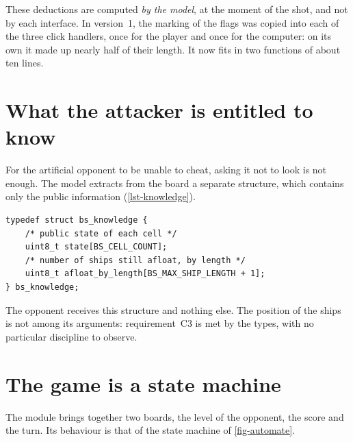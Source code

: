 These deductions are computed \emph{by the model}, at the moment of the shot, and not by each
interface. In version~1, the marking of the flags was copied into each of the three click
handlers, once for the player and once for the computer: on its own it made up nearly half
of their length. It now fits in two functions of about ten lines.

\section{What the attacker is entitled to know}
\label{sec-connaissance}

For the artificial opponent to be unable to cheat, asking it not to look is not enough. The
model extracts from the board a separate structure, which contains only the public
information (\cref{lst-knowledge}).

\begin{lstlisting}[caption={The public knowledge of a board.}, label={lst-knowledge}]
typedef struct bs_knowledge {
    /* public state of each cell */
    uint8_t state[BS_CELL_COUNT];
    /* number of ships still afloat, by length */
    uint8_t afloat_by_length[BS_MAX_SHIP_LENGTH + 1];
} bs_knowledge;
\end{lstlisting}

The opponent receives this structure and nothing else. The position of the ships is not
among its arguments: requirement~C3 is met by the types, with no particular discipline to
observe.

\section{The game is a state machine}

The  module brings together two boards, the level of the opponent, the score and
the turn. Its behaviour is that of the state machine of \cref{fig-automate}.

